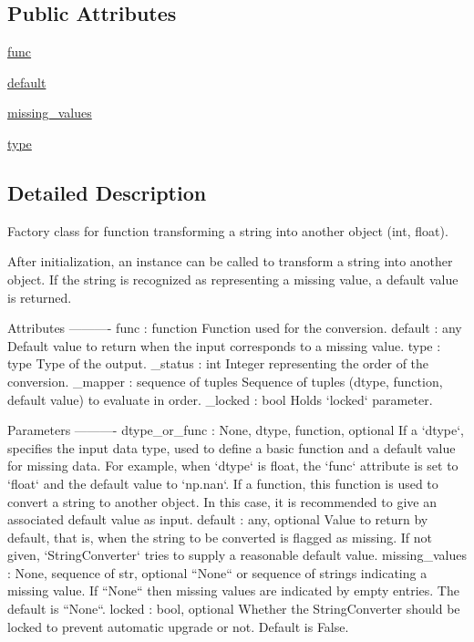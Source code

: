 \subsection*{Public Attributes}
\begin{DoxyCompactItemize}
\item 
\hyperlink{classnumpy_1_1lib_1_1__iotools_1_1StringConverter_a407bb68d9cd86102fabf65b7618c12d9}{func}
\item 
\hyperlink{classnumpy_1_1lib_1_1__iotools_1_1StringConverter_af6eeab2aded49e13460876c37f4791f9}{default}
\item 
\hyperlink{classnumpy_1_1lib_1_1__iotools_1_1StringConverter_a52f3ad6c429500d77e0f111072b2de36}{missing\+\_\+values}
\item 
\hyperlink{classnumpy_1_1lib_1_1__iotools_1_1StringConverter_a384ac106a689255808139a75b14bf28f}{type}
\end{DoxyCompactItemize}


\subsection{Detailed Description}
\begin{DoxyVerb}Factory class for function transforming a string into another object
(int, float).

After initialization, an instance can be called to transform a string
into another object. If the string is recognized as representing a
missing value, a default value is returned.

Attributes
----------
func : function
    Function used for the conversion.
default : any
    Default value to return when the input corresponds to a missing
    value.
type : type
    Type of the output.
_status : int
    Integer representing the order of the conversion.
_mapper : sequence of tuples
    Sequence of tuples (dtype, function, default value) to evaluate in
    order.
_locked : bool
    Holds `locked` parameter.

Parameters
----------
dtype_or_func : {None, dtype, function}, optional
    If a `dtype`, specifies the input data type, used to define a basic
    function and a default value for missing data. For example, when
    `dtype` is float, the `func` attribute is set to `float` and the
    default value to `np.nan`.  If a function, this function is used to
    convert a string to another object. In this case, it is recommended
    to give an associated default value as input.
default : any, optional
    Value to return by default, that is, when the string to be
    converted is flagged as missing. If not given, `StringConverter`
    tries to supply a reasonable default value.
missing_values : {None, sequence of str}, optional
    ``None`` or sequence of strings indicating a missing value. If ``None``
    then missing values are indicated by empty entries. The default is
    ``None``.
locked : bool, optional
    Whether the StringConverter should be locked to prevent automatic
    upgrade or not. Default is False.\end{DoxyVerb}
 


